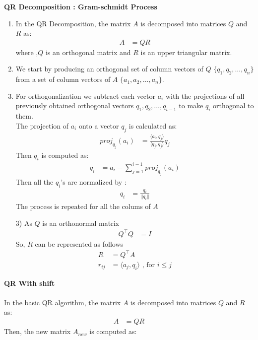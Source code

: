 \documentclass[journal]{IEEEtran}
\begin{document}
{\textbf{QR Decomposition : Gram-schmidt Process}
\begin{enumerate}
    \item  In the QR Decomposition, the matrix $A$ is decomposed into matrices $Q$ and $R$ as:
    \begin{align}
    A&=QR
    \end{align}
    where ,$Q$ is an orthogonal matrix and $R$ is an upper triangular matrix.
    \item We start by producing an orthogonal set of column vectors of $Q$ \( \{ q_1, q_2, \dots, q_n \} \) from a set of column vectors of $A$ \( \{ a_1, a_2, \dots, a_n \} \).
    \item For orthogonalization we subtract each vector $a_i$ with the projections of all previously obtained orthogonal vectors $q_1,q_2,\dots,q_{i-1}$ to make $q_i$ orthogonal to them. \\
    The projection of $a_i$ onto a vector $q_j$ is calculated as:
    \begin{align}
    proj_{q_j}(a_i) &= \frac{\langle a_i,q_j\rangle}{\langle q_j,q_j\rangle}q_j
    \end{align}
    Then $q_i$ is computed as:
    \begin{align}
    q_i &= a_i- \sum_{j=1}^{i-1}proj_{q_j}(a_i)
    \end{align}
    Then all the $q_i$'s are normalized by :
    \begin{align}
    q_i &= \frac{q_i}{||q_i||}
    \end{align}
    The process is repeated for all the colums of $A$
    \item[3)] As $Q$ is an orthonormal matrix
    \begin{align}
        Q^\top Q &=I
    \end{align}
    So, $R$ can be represented as follows
    \begin{align}
        R &= Q^\top A\\
        r_{ij} &= \langle a_j, q_i \rangle \text{ , for  }  i \leq j 
    \end{align}
\end{enumerate}
\textbf{QR With shift}\\
    \\
    In the basic QR algorithm, the matrix $A$ is decomposed into matrices $Q$ and $R$ as:
    \begin{align}
    A&=QR
    \end{align}
Then, the new matrix $A_{new}$ is computed as:
\begin{align}

\end{align}}
\end{document}
